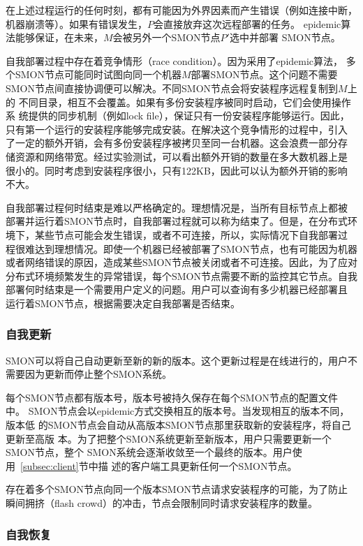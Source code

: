 在上述过程运行的任何时刻，都有可能因为外界因素而产生错误（例如连接中断，
机器崩溃等）。如果有错误发生，$P$会直接放弃这次远程部署的任务。
epidemic算法能够保证，在未来，$M$会被另外一个SMON节点$P'$选中并部署
SMON节点。

自我部署过程中存在着竞争情形（race condition）。因为采用了epidemic算法，
多个SMON节点可能同时试图向同一个机器$M$部署SMON节点。这个问题不需要
SMON节点间直接协调便可以解决。不同SMON节点会将安装程序远程复制到$M$上的
不同目录，相互不会覆盖。如果有多份安装程序被同时启动，它们会使用操作系
统提供的同步机制（例如lock file），保证只有一份安装程序能够运行。因此，
只有第一个运行的安装程序能够完成安装。在解决这个竞争情形的过程中，引入
了一定的额外开销，会有多份安装程序被拷贝至同一台机器。这会浪费一部分存
储资源和网络带宽。经过实验测试，可以看出额外开销的数量在多大数机器上是
很小的。同时考虑到安装程序很小，只有122KB，因此可以认为额外开销的影响
不大。

自我部署过程何时结束是难以严格确定的。理想情况是，当所有目标节点上都被
部署并运行着SMON节点时，自我部署过程就可以称为结束了。但是，在分布式环
境下，某些节点可能会发生错误，或者不可连接，所以，实际情况下自我部署过
程很难达到理想情况。即使一个机器已经被部署了SMON节点，也有可能因为机器
或者网络错误的原因，造成某些SMON节点被关闭或者不可连接。因此，为了应对
分布式环境频繁发生的异常错误，每个SMON节点需要不断的监控其它节点。自我
部署何时结束是一个需要用户定义的问题。用户可以查询有多少机器已经部署且
运行着SMON节点，根据需要决定自我部署是否结束。

\subsubsection*{自我更新}

SMON可以将自己自动更新至新的新的版本。这个更新过程是在线进行的，用户不
需要因为更新而停止整个SMON系统。

每个SMON节点都有版本号，版本号被持久保存在每个SMON节点的配置文件中。
SMON节点会以epidemic方式交换相互的版本号。当发现相互的版本不同，版本低
的SMON节点会自动从高版本SMON节点那里获取新的安装程序，将自己更新至高版
本。为了把整个SMON系统更新至新版本，用户只需要更新一个SMON节点，整个
SMON系统会逐渐收敛至一个最终的版本。用户使用~\ref{subsec:client}节中描
述的客户端工具更新任何一个SMON节点。

存在着多个SMON节点向同一个版本SMON节点请求安装程序的可能，为了防止
瞬间拥挤（flash crowd）的冲击，节点会限制同时请求安装程序的数量。

\subsubsection*{自我恢复}

